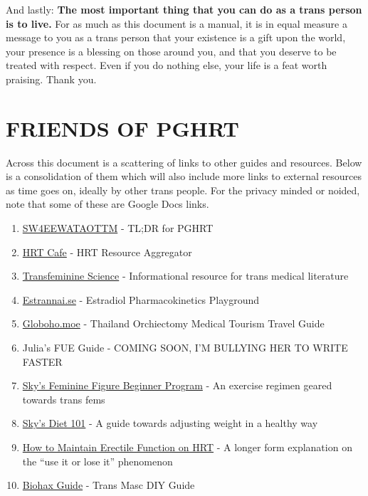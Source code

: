 \documentclass{article}
\begin{document}
And lastly: \textbf{The most important thing that you can do as a trans person is to live.} For as much as this document is a manual, it is in equal measure a message to you as a trans person that your existence is a gift upon the world, your presence is a blessing on those around you, and that you deserve to be treated with respect. Even if you do nothing else, your life is a feat worth praising. Thank you.



\section*{FRIENDS OF PGHRT}\label{FOPGHRT}

Across this document is a scattering of links to other guides and resources. Below is a consolidation of them which will also include more links to external resources as time goes on, ideally by other trans people. For the privacy minded or noided, note that some of these are Google Docs links.

\begin{enumerate}
  \item \href{https://startwith4mgestradiolenanthateweeklyandtestatonetothreemonths.com/}{SW4EEWATAOTTM} - TL;DR for PGHRT
  \item \href{https://hrtcafe.net/}{HRT Cafe} - HRT Resource Aggregator
  \item \href{https://transfemscience.org/}{Transfeminine Science} - Informational resource for trans medical literature
  \item \href{https://estrannai.se}{Estrannai.se} - Estradiol Pharmacokinetics Playground
  \item \href{https://globoho.moe/}{Globoho.moe} - Thailand Orchiectomy Medical Tourism Travel Guide
  \item Julia's FUE Guide - COMING SOON, I'M BULLYING HER TO WRITE FASTER
  \item \href{https://docs.google.com/document/d/1-NyE5EY5TTaRRMhk7HlTbKJ7HifjEsA4jlDO1qKQVl0/edit?tab=t.0}{Sky's Feminine Figure Beginner Program} - An exercise regimen geared towards trans fems
  \item \href{https://docs.google.com/document/d/114sztSw1aVWM2pXLDl9NrHklyvewz3EmFiHiisjM71k/edit?tab=t.0}{Sky's Diet 101} - A guide towards adjusting weight in a healthy way
  \item \href{https://stainedglasswoman.substack.com/p/how-to-maintain-your-penis-function}{How to Maintain Erectile Function on HRT} - A longer form explanation on the “use it or lose it” phenomenon
  \item \href{https://mega.nz/folder/cfwSmBbY#ify6kaueB8SdDD1v12t2Dw}{Biohax Guide} - Trans Masc DIY Guide
\end{enumerate}
\end{document}
